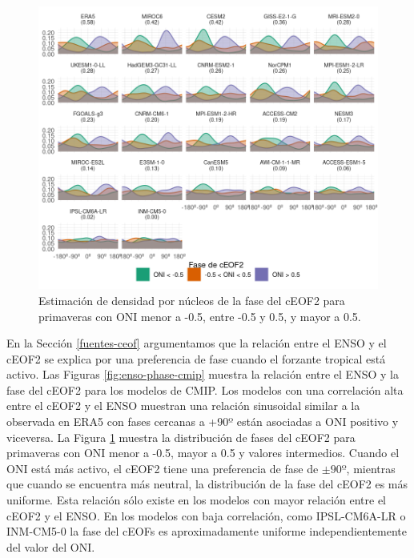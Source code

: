 \documentclass[12pt,oneside,a4paper]{reedthesis}
\begin{document}
\begin{figure}

{\centering \includegraphics{figures/50-cmip6/arg-enso-density-1} 

}

\caption{Estimación de densidad por núcleos de la fase del cEOF2 para primaveras con ONI menor a -0.5, entre -0.5 y 0.5, y mayor a 0.5.}\label{fig:arg-enso-density}
\end{figure}



En la Sección \ref{fuentes-ceof} argumentamos que la relación entre el ENSO y el cEOF2 se explica por una preferencia de fase cuando el forzante tropical está activo.
Las Figuras \ref{fig:enso-phase-cmip} muestra la relación entre el ENSO y la fase del cEOF2 para los modelos de CMIP.
Los modelos con una correlación alta entre el cEOF2 y el ENSO muestran una relación sinusoidal similar a la observada en ERA5 con fases cercanas a +90º están asociadas a ONI positivo y viceversa.
La Figura \ref{fig:arg-enso-density} muestra la distribución de fases del cEOF2 para primaveras con ONI menor a -0.5, mayor a 0.5 y valores intermedios.
Cuando el ONI está más activo, el cEOF2 tiene una preferencia de fase de \(\pm90º\), mientras que cuando se encuentra más neutral, la distribución de la fase del cEOF2 es más uniforme.
Esta relación sólo existe en los modelos con mayor relación entre el cEOF2 y el ENSO.
En los modelos con baja correlación, como IPSL-CM6A-LR o INM-CM5-0 la fase del cEOFs es aproximadamente uniforme independientemente del valor del ONI.
\end{document}
